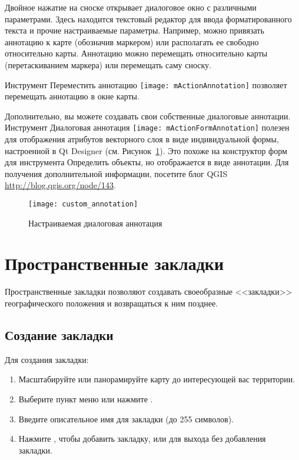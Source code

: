 Двойное нажатие на сноске открывает диалоговое окно с различными параметрами.
Здесь находится текстовый редактор для ввода форматированного текста и прочие
настраиваемые параметры. Например, можно привязать аннотацию к карте
(обозначив маркером) или располагать ее свободно относительно карты. Аннотацию
можно перемещать относительно карты (перетаскиванием маркера) или перемещать
саму сноску.

Инструмент Переместить аннотацию
\texttt{[image: mActionAnnotation]} позволяет
перемещать аннотацию в окне карты.


Дополнительно, вы можете создавать свои собственные диалоговые аннотации.
Инструмент Диалоговая аннотация
\texttt{[image: mActionFormAnnotation]} полезен
для отображения атрибутов векторного слоя в виде индивидуальной формы,
настроенной в Qt Designer (см. Рисунок~\ref{fig:custom-annotations}).
Это похоже на конструктор форм для инструмента Определить объекты, но
отображается в виде аннотации. Для получения дополнительной информации,
посетите блог QGIS \url{http://blog.qgis.org/node/143}.

\begin{figure}[ht]
   \centering
   \texttt{[image: custom\_annotation]}
   \caption{Настраиваемая диалоговая аннотация \nixcaption}
   \label{fig:custom-annotations}
\end{figure}

\newpage

\section{Пространственные закладки}\label{sec:bookmarks}

Пространственные закладки позволяют создавать своеобразные <<закладки>>
географического положения и возвращаться к ним позднее.

\subsection{Создание закладки}
Для создания закладки:
\begin{enumerate}
\item Масштабируйте или панорамируйте карту до интересующей вас территории.
\item Выберите пункт меню  \arrow
{} или нажмите .
\item Введите описательное имя для закладки (до 255 символов).
\item Нажмите , чтобы добавить закладку, или 
для выхода без добавления закладки.
\end{enumerate}

